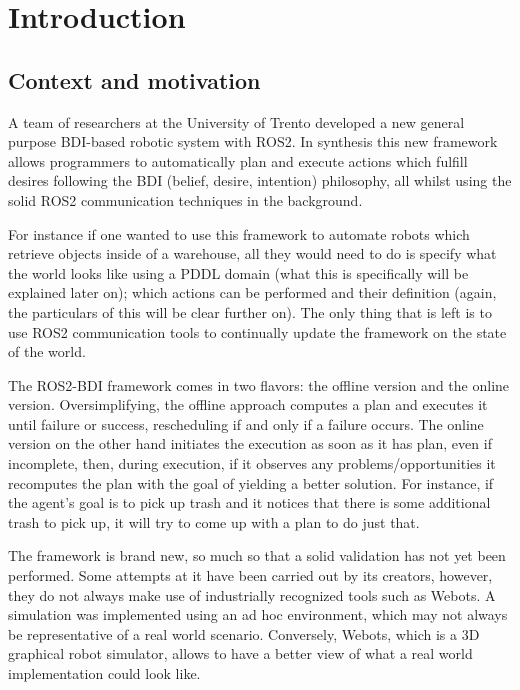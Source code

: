\chapter{Introduction}
\section{Context and motivation}
A team of researchers at the University of Trento developed a new general purpose BDI-based robotic system with ROS2. In synthesis this new framework allows programmers to automatically plan and execute actions which fulfill desires following the BDI (belief, desire, intention) philosophy, all whilst using the solid ROS2 communication techniques in the background. 
\par
For instance if one wanted to use this framework to automate robots which retrieve objects inside of a warehouse, all they would need to do is specify what the world looks like using a PDDL domain (what this is specifically will be explained later on); which actions can be performed and their definition (again, the particulars of this will be clear further on). The only thing that is left is to use ROS2 communication tools to continually update the framework on the state of the world.  
\par
The ROS2-BDI framework comes in two flavors: the offline version and the online version. Oversimplifying, the offline approach computes a plan and executes it until failure or success, rescheduling if and only if a failure occurs. The online version on the other hand initiates the execution as soon as it has plan, even if incomplete, then, during execution, if it observes any problems/opportunities it recomputes the plan with the goal of yielding a better solution. For instance, if the agent's goal is to pick up trash and it notices that there is some additional trash to pick up, it will try to come up with a plan to do just that.
\par
The framework is brand new, so much so that a solid validation has not yet been performed. Some attempts at it have been carried out by its creators, however, they do not always make use of industrially recognized tools such as Webots. A simulation was implemented using an ad hoc environment, which may not always be representative of a real world scenario. Conversely, Webots, which is a 3D graphical robot simulator, allows to have a better view of what a real world implementation could look like. 
